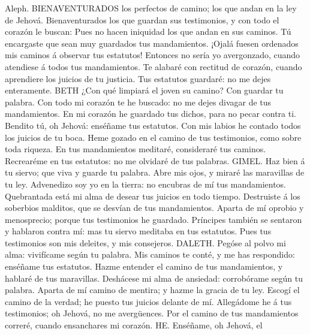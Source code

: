  Aleph. BIENAVENTURADOS los perfectos de camino; los que
andan en la ley de Jehová.  Bienaventurados los que
guardan sus testimonios, y con todo el corazón le buscan: 
Pues no hacen iniquidad los que andan en sus caminos.  Tú
encargaste que sean muy guardados tus mandamientos. 
¡Ojalá fuesen ordenados mis caminos á observar tus estatutos!
 Entonces no sería yo avergonzado, cuando atendiese á
todos tus mandamientos.  Te alabaré con rectitud de
corazón, cuando aprendiere los juicios de tu justicia. 
Tus estatutos guardaré: no me dejes enteramente.  BETH
¿Con qué limpiará el joven su camino? Con guardar tu palabra.
 Con todo mi corazón te he buscado: no me dejes divagar
de tus mandamientos.  En mi corazón he guardado tus
dichos, para no pecar contra ti.  Bendito tú, oh Jehová:
enséñame tus estatutos.  Con mis labios he contado todos
los juicios de tu boca.  Heme gozado en el camino de tus
testimonios, como sobre toda riqueza.  En tus
mandamientos meditaré, consideraré tus caminos. 
Recrearéme en tus estatutos: no me olvidaré de tus palabras.
 GIMEL. Haz bien á tu siervo; que viva y guarde tu
palabra.  Abre mis ojos, y miraré las maravillas de tu
ley.  Advenedizo soy yo en la tierra: no encubras de mí
tus mandamientos.  Quebrantada está mi alma de desear tus
juicios en todo tiempo.  Destruiste á los soberbios
malditos, que se desvían de tus mandamientos.  Aparta de
mí oprobio y menosprecio; porque tus testimonios he guardado.
 Príncipes también se sentaron y hablaron contra mí: mas
tu siervo meditaba en tus estatutos.  Pues tus
testimonios son mis deleites, y mis consejeros.  DALETH.
Pegóse al polvo mi alma: vivifícame según tu palabra. 
Mis caminos te conté, y me has respondido: enséñame tus estatutos.
 Hazme entender el camino de tus mandamientos, y hablaré
de tus maravillas.  Deshácese mi alma de ansiedad:
corrobórame según tu palabra.  Aparta de mí camino de
mentira; y hazme la gracia de tu ley.  Escogí el camino
de la verdad; he puesto tus juicios delante de mí. 
Allegádome he á tus testimonios; oh Jehová, no me avergüences.
 Por el camino de tus mandamientos correré, cuando
ensanchares mi corazón.  HE. Enséñame, oh Jehová, el
